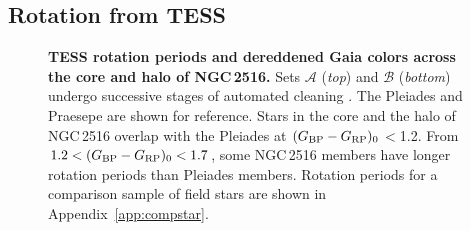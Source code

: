 \documentclass[12pt,twocolumn,tighten]{aastex63}
\newcommand{\cn}{NGC\,2516} %
\newcommand{\bpmrpo}{(G_{\rm BP}-G_{\rm RP})_0}
\begin{document}
\subsection{Rotation from TESS}
\label{subsec:tess}

\begin{figure}[tp!]
	\begin{center}
		\leavevmode

    \vspace{-0.7cm}
	\end{center}
	\vspace{-0.7cm}
  \caption{ {\bf TESS rotation periods and dereddened Gaia colors
  across the core and halo of \cn.} Sets $\mathcal{A}$ ({\it top})
  and $\mathcal{B}$ ({\it bottom}) undergo successive stages of
  automated cleaning .  The Pleiades
  \citep[125\,Myr;][]{rebull_rotation_2016a} and Praesepe
  \citep[650\,Myr;][]{douglas_poking_2017} are shown for reference.
  Stars in the core and the halo of NGC\,2516 overlap with the
  Pleiades at $\bpmrpo$$<$1.2.  From $1.2<\bpmrpo<1.7$, some NGC\,2516
  members have longer rotation periods than Pleiades members. Rotation
  periods for a comparison sample of field stars are shown in
  Appendix~\ref{app:compstar}.
  \label{fig:rot}
	}
\end{figure}
\end{document}
